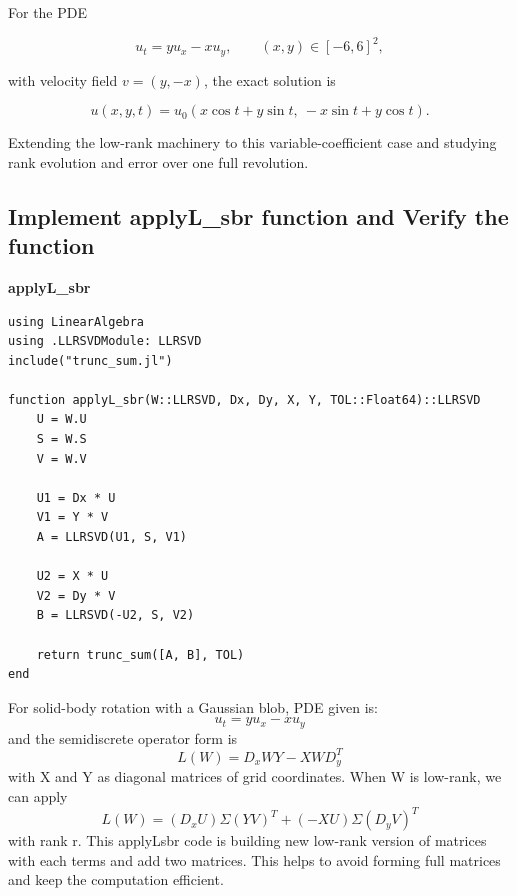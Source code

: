 \documentclass[11pt]{report}
\begin{document}
For the PDE


\[
u_t = y u_x - x u_y,\qquad (x,y)\in[-6,6]^2,
\]


with velocity field \(v=(y,-x)\), the exact solution is


\[
u(x,y,t) = u_0(x\cos t + y\sin t,\ -x\sin t + y\cos t).
\]


Extending the low-rank machinery to this variable-coefficient case and studying rank evolution and error over one full revolution.

\subsection{Implement applyL\_sbr function and Verify the function}
\textbf{applyL\_sbr}
\begin{lstlisting}
using LinearAlgebra
using .LLRSVDModule: LLRSVD
include("trunc_sum.jl")

function applyL_sbr(W::LLRSVD, Dx, Dy, X, Y, TOL::Float64)::LLRSVD
    U = W.U
    S = W.S
    V = W.V

    U1 = Dx * U
    V1 = Y * V
    A = LLRSVD(U1, S, V1)

    U2 = X * U
    V2 = Dy * V
    B = LLRSVD(-U2, S, V2)

    return trunc_sum([A, B], TOL)  
end

\end{lstlisting}

For solid-body rotation with a Gaussian blob, PDE given is:
\[
u_t = yu_x - xu_y
\]
and the semidiscrete operator form is 
\[
L(W) = D_xWY -XWD_y^T
\]
with X and Y as diagonal matrices of grid coordinates.
When W is low-rank, we can apply 
\[
L(W) = (D_xU)\Sigma(YV)^T +(-XU)\Sigma(D_yV)^T
\]
with rank r. This applyL\-sbr code is building new low-rank version of matrices with each terms and add two matrices. This helps to avoid forming full matrices and keep the computation efficient.
\end{document}

